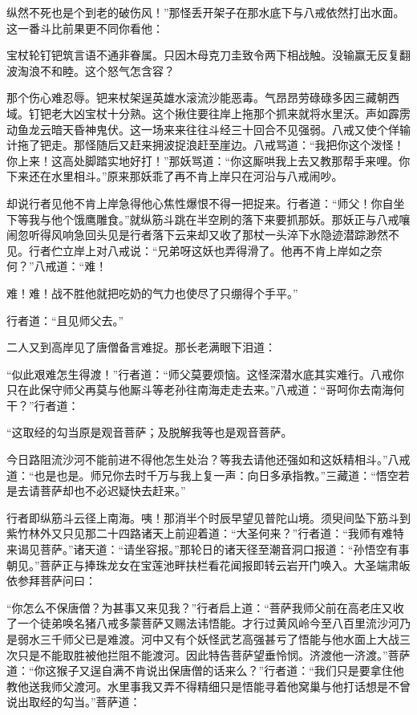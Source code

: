 \documentclass[12pt,UTF8]{ctexbook}
\begin{document}
纵然不死也是个到老的破伤风！”那怪丢开架子在那水底下与八戒依然打出水面。这一番斗比前果更不同你看他：

宝杖轮钉钯筑言语不通非眷属。只因木母克刀圭致令两下相战触。没输赢无反复翻波淘浪不和睦。这个怒气怎含容？

那个伤心难忍辱。钯来杖架逞英雄水滚流沙能恶毒。气昂昂劳碌碌多因三藏朝西域。钉钯老大凶宝杖十分熟。这个揪住要往岸上拖那个抓来就将水里沃。声如霹雳动鱼龙云暗天昏神鬼伏。这一场来来往往斗经三十回合不见强弱。八戒又使个佯输计拖了钯走。那怪随后又赶来拥波捉浪赶至崖边。八戒骂道：“我把你这个泼怪！你上来！这高处脚踏实地好打！”那妖骂道：“你这厮哄我上去又教那帮手来哩。你下来还在水里相斗。”原来那妖乖了再不肯上岸只在河沿与八戒闹吵。

却说行者见他不肯上岸急得他心焦性爆恨不得一把捉来。行者道：“师父！你自坐下等我与他个饿鹰雕食。”就纵筋斗跳在半空刷的落下来要抓那妖。那妖正与八戒嚷闹忽听得风响急回头见是行者落下云来却又收了那杖一头淬下水隐迹潜踪渺然不见。行者伫立岸上对八戒说：“兄弟呀这妖也弄得滑了。他再不肯上岸如之奈何？”八戒道：“难！

难！难！战不胜他就把吃奶的气力也使尽了只绷得个手平。”

行者道：“且见师父去。”

二人又到高岸见了唐僧备言难捉。那长老满眼下泪道：

“似此艰难怎生得渡！”行者道：“师父莫要烦恼。这怪深潜水底其实难行。八戒你只在此保守师父再莫与他厮斗等老孙往南海走走去来。”八戒道：“哥呵你去南海何干？”行者道：

“这取经的勾当原是观音菩萨；及脱解我等也是观音菩萨。

今日路阻流沙河不能前进不得他怎生处治？等我去请他还强如和这妖精相斗。”八戒道：“也是也是。师兄你去时千万与我上复一声：向日多承指教。”三藏道：“悟空若是去请菩萨却也不必迟疑快去赶来。”

行者即纵筋斗云径上南海。咦！那消半个时辰早望见普陀山境。须臾间坠下筋斗到紫竹林外又只见那二十四路诸天上前迎着道：“大圣何来？”行者道：“我师有难特来谒见菩萨。”诸天道：“请坐容报。”那轮日的诸天径至潮音洞口报道：“孙悟空有事朝见。”菩萨正与捧珠龙女在宝莲池畔扶栏看花闻报即转云岩开门唤入。大圣端肃皈依参拜菩萨问曰：

“你怎么不保唐僧？为甚事又来见我？”行者启上道：“菩萨我师父前在高老庄又收了一个徒弟唤名猪八戒多蒙菩萨又赐法讳悟能。才行过黄风岭今至八百里流沙河乃是弱水三千师父已是难渡。河中又有个妖怪武艺高强甚亏了悟能与他水面上大战三次只是不能取胜被他拦阻不能渡河。因此特告菩萨望垂怜悯。济渡他一济渡。”菩萨道：“你这猴子又逞自满不肯说出保唐僧的话来么？”行者道：“我们只是要拿住他教他送我师父渡河。水里事我又弄不得精细只是悟能寻着他窝巢与他打话想是不曾说出取经的勾当。”菩萨道：
\end{document}
